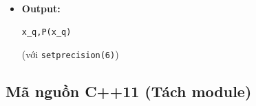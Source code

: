 \begin{itemize}
\begin{itemize}
        \begin{itemize}
            \item Hàm \texttt{readQueries(path, queries)}
        \end{itemize}

        \item \textbf{Module 3 (Tính Lagrange basis):}

        \begin{itemize}
            \item 
            \[
            L_i(x)=\prod_{j \ne i}\frac{x-x_j}{x_i-x_j}
            \]
        \end{itemize}

        \item \textbf{Module 4 (Tính đa thức nội suy):}

        \begin{itemize}
            \item 
            \[
            P(x)=\sum_{i=0}^{n-1} y_i \cdot L_i(x)
            \]
            \item Không cần tính hệ số đa thức
        \end{itemize}

        \item \textbf{Module 5 (Ghi kết quả):}

        \begin{itemize}
            \item Ghi file \texttt{result.csv}
            \item Format:
\begin{lstlisting}
x_q,P(x_q)
\end{lstlisting}
        \end{itemize}

    \end{itemize}

    \item \textbf{Output:}

\begin{lstlisting}
x_q,P(x_q)
\end{lstlisting}

(với \texttt{setprecision(6)})

\end{itemize}

\subsection{Mã nguồn C++11 (Tách module)}

